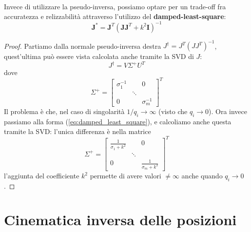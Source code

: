 Invece di utilizzare la pseudo-inversa, possiamo optare per un trade-off fra accuratezza e relizzabilità attraverso l'utilizzo del \textbf{damped-least-square}:
\begin{equation}\label{eq:damped_least_square}
\bm{J}^* = \bm{J}^T(\bm{J}\bm{J}^T + k^2\bm{I})^{-1}
\end{equation}

\begin{proof}
Partiamo dalla normale pseudo-inversa destra $J^\dagger = J^T(JJ^T)^{-1}$, quest'ultima può essere vista calcolata anche tramite la SVD di $J$:
$$
J^\dagger = V\Sigma^+ U^T
$$
dove
$$
\Sigma^{+}
=
\begin{bmatrix}
	\sigma_1^{-1} & & 0 \\
	& \ddots & \\
	0 & & \sigma_m^{-1}
\end{bmatrix}^T
$$
Il problema è che, nel caso di singolarità $1/q_i \to \infty$ (visto che $q_i \to 0$). Ora invece passiamo alla forma (\ref{eq:damped_least_square}), e calcoliamo anche questa tramite la SVD: l'unica differenza è nella matrice
$$
\Sigma^{+}
=
\begin{bmatrix}
	\frac{1}{\sigma_1 + k^2} & & 0 \\
	& \ddots & \\
	0 & & \frac{1}{\sigma_m + k^2}
\end{bmatrix}^T
$$
l'aggiunta del coefficiente $k^2$ permette di avere valori $\neq \infty$ anche quando $q_i \to 0$.
\end{proof}





\section{Cinematica inversa delle posizioni}
